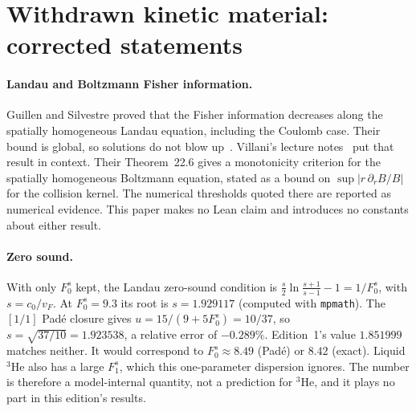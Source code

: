 \documentclass[11pt,a4paper]{article}
\theoremstyle{definition}
\begin{document}
\section{Withdrawn kinetic material: corrected statements}
\label{sec:withdrawn}
\paragraph{Landau and Boltzmann Fisher information.} Guillen and Silvestre proved that the Fisher information decreases along the spatially homogeneous Landau equation, including the Coulomb case. Their bound is global, so solutions do not blow up~\cite{GuillenSilvestre2025}. Villani's lecture notes~\cite{Villani2025} put that result in context. Their Theorem~22.6 gives a monotonicity criterion for the spatially homogeneous Boltzmann equation, stated as a bound on $\sup|r\,\partial_rB/B|$ for the collision kernel. The numerical thresholds quoted there are reported as numerical evidence. This paper makes no Lean claim and introduces no constants about either result.

\paragraph{Zero sound.} With only $F_0^s$ kept, the Landau zero-sound condition is $\tfrac s2\ln\tfrac{s+1}{s-1}-1=1/F_0^s$, with $s=c_0/v_F$. At $F_0^s=9.3$ its root is $s=1.929117$ (computed with \texttt{mpmath}). The $[1/1]$ Pad\'e closure gives $u=15/(9+5F_0^s)=10/37$, so $s=\sqrt{37/10}=1.923538$, a relative error of $-0.289\%$. Edition~1's value $1.851999$ matches neither. It would correspond to $F_0^s\approx8.49$ (Pad\'e) or $8.42$ (exact). Liquid $^3$He also has a large $F_1^s$, which this one-parameter dispersion ignores. The number is therefore a model-internal quantity, not a prediction for $^3$He, and it plays no part in this edition's results.
\end{document}
